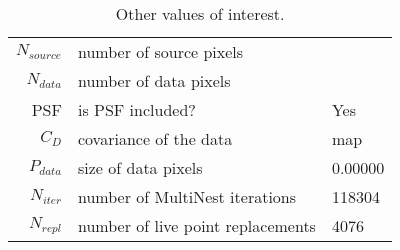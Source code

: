 \begin{table*}[!htb]\caption{Other values of interest.}\begin{center}\begin{tabular}{ r l l }\hline $N_{source}$ & number of source pixels           &  \\ 
 $N_{data}$   & number of data pixels             &  \\ 
 PSF & is PSF included?                          & Yes \\
 $C_D$        & covariance of the data            & map \\ 
 $P_{data}$   & size of data pixels               &    0.00000 \\ 
 $N_{iter}$   & number of MultiNest iterations    & 118304 \\ 
 $N_{repl}$   & number of live point replacements & 4076 \\ 
\hline\end{tabular}\end{center}\label{tab:3}\end{table*}